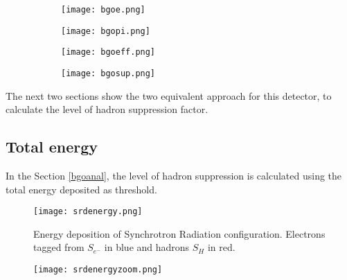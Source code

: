 \begin{figure}[ht]
		\centering
		\hspace*{\fill}
		\begin{subfigure}[b]{0.45\textwidth}
			\centering
			\texttt{[image: bgoe.png]}
			\caption{}\label{}
		\end{subfigure}
		\hfill
		\begin{subfigure}[b]{0.45\textwidth}
			\centering
			\texttt{[image: bgopi.png]}
			\caption{}\label{}
		\end{subfigure}
		\hspace*{\fill}
		\caption{}\label{}
\end{figure}
\begin{figure}[ht]
		\centering
		\hspace*{\fill}
		\begin{subfigure}[b]{0.45\textwidth}
			\centering
			\texttt{[image: bgoeff.png]}
			\caption{}\label{}
		\end{subfigure}
		\hfill
		\begin{subfigure}[b]{0.45\textwidth}
			\centering
			\texttt{[image: bgosup.png]}
			\caption{}\label{}
		\end{subfigure}
		\hspace*{\fill}
		\caption{}\label{}
\end{figure}

The next two sections show the two equivalent approach for this detector, to calculate the level of hadron suppression
factor. 
\subsection{Total energy}
In the Section \ref{bgoanal}, the level of hadron suppression is calculated using the total energy deposited as
threshold. 


\begin{figure}[ht]
	\hspace*{\fill}
	\centering
	\texttt{[image: srdenergy.png]}
	\hspace*{\fill}
	\caption{Energy deposition of Synchrotron Radiation configuration. Electrons tagged from $S_{e^-}$ in blue and hadrons
	$S_H$ in red.}\label{srdenergy}
\end{figure}

\begin{figure}[ht]
	\hspace*{\fill}
	\centering
	\texttt{[image: srdenergyzoom.png]}
	\hspace*{\fill}
	\caption{}\label{}
\end{figure}

